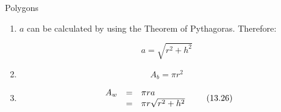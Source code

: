 \begin{exercises}{Polygons}
{\begin{mdframed}[linewidth=4, leftmargin=40, rightmargin=40]
\begin{exercise}
\begin{enumerate}[noitemsep, label=\textbf{Step} \textbf{\arabic*}. ]
	\begin{figure}[H] %
    \begin{center}
    \label{m39357*id62779!!!underscore!!!media}\label{m39357*id62779!!!underscore!!!printimage}\texttt{[image: col11306.imgs/m39357\_MG11C16\_003.png]} %
        
      \vspace{2pt}
    \vspace{.1in}
    
    \end{center}

 \end{figure}   

    \addtocounter{footnote}{-0}
    
      \par 
      \label{m39357*id62785}This curved surface can be cut into many thin triangles with height close to $a$ ($a$ is called the \textsl{slant height}). The area of these triangles will add up to $\frac{1}{2}\ensuremath{\times}$base$\ensuremath{\times}$height(of a small triangle) which is $\frac{1}{2}\ensuremath{\times}2\pi r\ensuremath{\times}a=\pi ra$\par 
      \item  
      \label{m39357*id62881}$a$ can be calculated by using the Theorem of Pythagoras. Therefore:\par 
      \label{m39357*id62892}\nopagebreak\noindent{}
        
    \begin{equation}
    a=\sqrt{{r}^{2}+{h}^{2}}\tag{13.24}
      \end{equation}
    
      
      \item  
      \label{m39357*id62928}\nopagebreak\noindent{}
        
    \begin{equation}
    {A}_{b}=\pi {r}^{2}\tag{13.25}
      \end{equation}
    
      
      \item  
      \label{m39357*id62960}\nopagebreak\noindent{}
        
    \begin{equation}
    \begin{array}{ccc}\hfill {A}_{w}& =& \pi ra\hfill \\ & =& \pi r\sqrt{{r}^{2}+{h}^{2}}\hfill \end{array}\tag{13.26}
      \end{equation}
    

\end{enumerate}
\end{exercise}
\end{mdframed}}
\end{exercises}
